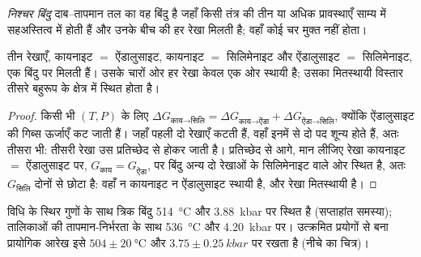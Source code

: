 \begin{definition}[निश्चर बिंदु]\label{def:b2:metamorphic-facies:invariant}
\emph{निश्चर बिंदु} दाब--तापमान तल का वह बिंदु है
जहाँ किसी तंत्र की तीन या अधिक प्रावस्थाएँ साम्य में सहअस्तित्व में होती हैं
और उनके बीच की हर  रेखा मिलती है; वहाँ कोई चर मुक्त नहीं होता।
\end{definition}

\begin{proposition}[त्रिक बिंदु]\label{prop:b2:metamorphic-facies:triple}
तीन रेखाएँ, कायनाइट $=$ ऐंडालुसाइट, कायनाइट $=$ सिलिमेनाइट और ऐंडालुसाइट $=$
सिलिमेनाइट, एक बिंदु पर मिलती हैं। उसके चारों ओर हर रेखा केवल एक ओर स्थायी है; उसका
मितस्थायी विस्तार तीसरे बहुरूप के क्षेत्र में स्थित होता है।
\end{proposition}

\begin{proof}
किसी भी $(T, P)$ के लिए $\Delta G_{\text{काय}\to\text{सिलि}} = \Delta G_{\text{काय}\to\text{ऐंडा}} +
\Delta G_{\text{ऐंडा}\to\text{सिलि}}$, क्योंकि ऐंडालुसाइट की गिब्स ऊर्जाएँ कट जाती हैं। जहाँ
पहली दो रेखाएँ कटती हैं, वहाँ इनमें से दो पद शून्य होते हैं, अतः तीसरा भी: तीसरी
रेखा उस प्रतिच्छेद से होकर जाती है। प्रतिच्छेद से आगे, मान लीजिए रेखा कायनाइट $=$ ऐंडालुसाइट पर,
$G_{\text{काय}} = G_{\text{ऐंडा}}$, पर बिंदु अन्य दो रेखाओं के सिलिमेनाइट वाले ओर स्थित है,
अतः $G_{\text{सिलि}}$ दोनों से छोटा है: वहाँ न कायनाइट न ऐंडालुसाइट
स्थायी है, और रेखा मितस्थायी है।
\end{proof}

विधि के स्थिर गुणों के साथ त्रिक बिंदु
\qty{514}{\celsius} और \qty{3.88}{kbar} पर स्थित है (सप्ताहांत समस्या); तालिकाओं की तापमान-निर्भरता के साथ
\qty{536}{\celsius} और \qty{4.20}{kbar} पर। उत्क्रमित प्रयोगों से बना प्रायोगिक
आरेख इसे $504 \pm \qty{20}{\celsius}$ और
$3.75 \pm \qty{0.25}{kbar}$ पर रखता है (नीचे का चित्र)।

